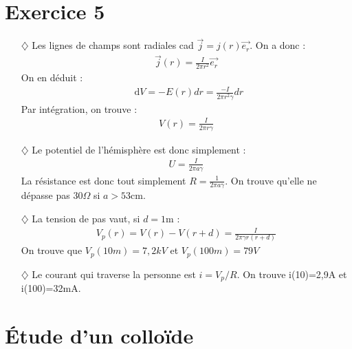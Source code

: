 \documentclass{report}
\newcommand*\dif{\mathop{}\!\mathrm{d}}
\begin{document}
\section*{Exercice 5}

\begin{itemize}

	\item[$\diamondsuit$] Les lignes de champs sont radiales cad $\vec{j}=j(r)\vec{e_r}$. On a donc :
\begin{align*}
	\vec{j}(r)=\frac{I}{2\pi r^2}\vec{e_r}
\end{align*}
On en déduit :
\begin{align*}
	\dif V=-E(r)dr=\frac{-I}{2\pi r^2\gamma}dr
\end{align*}
Par intégration, on trouve :
\begin{align*}
	V(r)=\frac{I}{2\pi r\gamma}
\end{align*}

	\item[$\diamondsuit$] Le potentiel de l'hémisphère est donc simplement :
\begin{align*}
	U=\frac{I}{2\pi a\gamma}
\end{align*}
La résistance est donc tout simplement $R=\frac{1}{2\pi a \gamma}$. On trouve qu'elle ne dépasse pas 30$\Omega$ si $a>53$cm.

	\item[$\diamondsuit$] La tension de pas vaut, si $d=1$m :
	\begin{align*}
		V_p(r)=V(r)-V(r+d)=\frac{I}{2\pi \gamma r(r+d)}
	\end{align*}
On trouve que $V_p(10m)=7,2kV$ et  $V_p(100m)=79V$

	\item[$\diamondsuit$] Le courant qui traverse la personne est $i=V_p/R$. On trouve i(10)=2,9A et i(100)=32mA.
\end{itemize}

\section*{Étude d'un colloïde}
\end{document}
